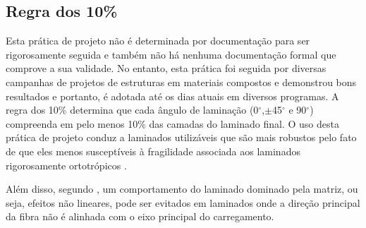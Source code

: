 \subsection{Regra dos 10\%}
Esta prática de projeto não é determinada por documentação  para ser rigorosamente seguida e também não há nenhuma documentação formal que comprove a sua validade. No entanto, esta prática foi seguida por diversas campanhas de projetos de estruturas em materiais compostos e demonstrou bons resultados e portanto, é adotada até os dias atuais em diversos programas. A regra dos 10\% determina que cada ângulo de laminação (0$^{\circ}$,$\pm$45$^{\circ}$ e 90$^{\circ}$) compreenda em pelo menos 10\% das camadas do laminado final. O uso desta prática de projeto conduz a laminados utilizáveis que são mais robustos pelo fato de que eles menos susceptíveis à fragilidade associada aos laminados rigorosamente ortotrópicos \cite{nasa1997guidelines}.

Além disso, segundo \cite{mil2002handbook}, um comportamento do laminado dominado pela matriz, ou seja, efeitos não lineares, pode ser evitados em laminados onde a direção principal da fibra não é alinhada com o eixo principal do carregamento.
